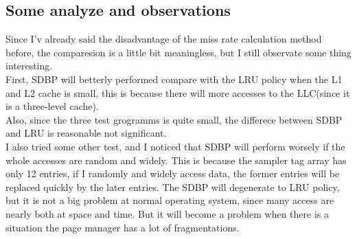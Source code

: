 \documentclass{article}
\begin{document}
\subsection{Some analyze and observations}
Since I'v already said the disadvantage of the miss rate calculation method before, the comparesion is a little bit meaningless, but I still observate some thing interesting.\\
First, SDBP will betterly performed compare with the LRU policy when the L1 and L2 cache is small, this is because there will more accesses to the LLC(since it is a three-level cache). \\
Also, since the three test grogramms is quite small, the differece between SDBP and LRU is reasonable not significant.\\
I also tried some other test, and I noticed that SDBP will perform worsely if the whole accesses are random and widely. This is because the sampler tag array has only 12 entries, if I randomly and widely access data, the former entries will be replaced quickly by the later entries. The SDBP will degenerate to LRU policy, but it is not a big problem at normal operating system, since many access are nearly both at space and time. But it will become a problem when there is a situation the page manager has a lot of fragmentations.
\end{document}
